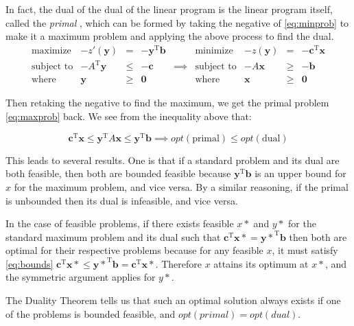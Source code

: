 \documentclass[12pt]{article}
\begin{document}
In fact, the dual of the dual of the linear program is the linear program itself, called the \textit{primal} \cite{trevisan}, which can be formed by taking the negative of \eqref{eq:minprob} to make it a maximum problem and applying the above process to find the dual.
\begin{equation} 
    \begin{array}{rrrrrrrcl}
        \text{maximize} & -z'(\mathbf{y}) & = & -\mathbf{y}^\text{T} \mathbf{b} & &  \text{minimize} & -z(\mathbf{y}) & = & -\mathbf{c}^\text{T} \mathbf{x}  \\
        \text{subject\ to} & -A^\text{T} \mathbf{y} & \leq & -\mathbf{c} & \implies &  \text{subject\ to} & -A \mathbf{x} & \geq & -\mathbf{b} \\
        \text{where} & \mathbf{y} & \geq & \mathbf{0} & & \text{where} & \mathbf{x} & \geq & \mathbf{0}
    \end{array}
\end{equation}

Then retaking the negative to find the maximum, we get the primal problem \eqref{eq:maxprob} back. We see from the inequality above that:

\begin{equation}\label{eq:bounds}
\mathbf{c}^\text{T} \mathbf{x} \leq \mathbf{y}^\text{T}A \mathbf{x} \leq \mathbf{y}^\text{T} \mathbf{b} \implies opt(\text{primal}) \leq opt(\text{dual})
\end{equation}

This leads to several results. One is that if a standard problem and its dual are both feasible, then both are bounded feasible because $\mathbf{y}^\text{T} \mathbf{b}$ is an upper bound for $x$ for the maximum problem, and vice versa. By a similar reasoning, if the primal is unbounded then its dual is infeasible, and vice versa.

In the case of feasible problems, if there exists feasible $x*$ and $y*$ for the standard maximum problem and its dual such that $\mathbf{c}^\text{T} \mathbf{x*} = \mathbf{y*}^\text{T} \mathbf{b}$ then both are optimal for their respective problems because for any feasible $x$, it must satisfy \eqref{eq:bounds} $\mathbf{c}^\text{T} \mathbf{x*} \leq \mathbf{y*}^\text{T} \mathbf{b} = \mathbf{c}^\text{T} \mathbf{x*}$. Therefore $x$ attains its optimum at $x*$, and the symmetric argument applies for $y*$. 

The Duality Theorem tells us that such an optimal solution always exists if one of the problems is bounded feasible, and $opt(primal) = opt(dual)$.
\end{document}
